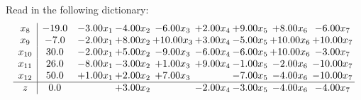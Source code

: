\documentclass[9pt]{article}
\begin{document}
Read in the following dictionary:
\[\begin{array}{c| c c@{\hskip 2pt} c@{\hskip 2pt} c@{\hskip 2pt} c@{\hskip 2pt} c@{\hskip 2pt} c@{\hskip 2pt} c@{\hskip 2pt} }
 x_{8}   &  -19.0 & -3.00 x_{1} & -4.00 x_{2} & -6.00 x_{3} & +  2.00 x_{4} & +  9.00 x_{5} & +  8.00 x_{6} & -6.00 x_{7}\\
 x_{9}   &  -7.0 & -2.00 x_{1} & +  8.00 x_{2} & + 10.00 x_{3} & +  3.00 x_{4} & -5.00 x_{5} & + 10.00 x_{6} & + 10.00 x_{7}\\
 x_{10}   &  30.0 & -2.00 x_{1} & +  5.00 x_{2} & -9.00 x_{3} & -6.00 x_{4} & -6.00 x_{5} & + 10.00 x_{6} & -3.00 x_{7}\\
 x_{11}   &  26.0 & -8.00 x_{1} & -3.00 x_{2} & +  1.00 x_{3} & +  9.00 x_{4} & -1.00 x_{5} & -2.00 x_{6} & -10.00 x_{7}\\
 x_{12}   &  50.0 & +  1.00 x_{1} & +  2.00 x_{2} & +  7.00 x_{3} &   & -7.00 x_{5} & -4.00 x_{6} & -10.00 x_{7}\\
\hline
z    &  0.0  &   & +  3.00 x_{2} &   & -2.00 x_{4} & -3.00 x_{5} & -4.00 x_{6} & -4.00 x_{7}\\
\end{array}\]
\end{document}
